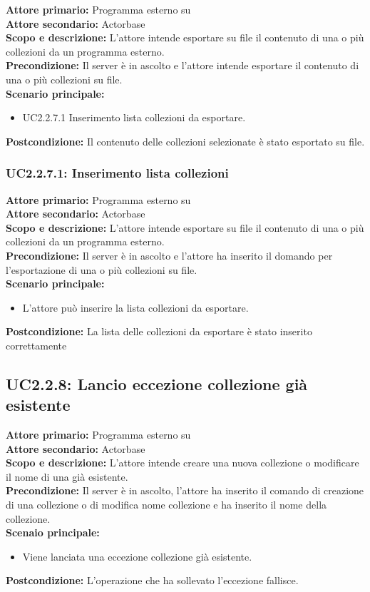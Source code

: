 \documentclass{scalatekids-article}
\begin{document}
\textbf{Attore primario:} Programma esterno su \\
\textbf{Attore secondario:} Actorbase\\
\textbf{Scopo e descrizione:} L'attore intende esportare su file il contenuto di una o più collezioni da un programma  esterno.\\
\textbf{Precondizione:} Il server è in ascolto e l'attore intende esportare il contenuto di una o più collezioni su file.\\
\textbf{Scenario principale:}
\begin{itemize}
\item UC2.2.7.1 Inserimento lista collezioni da esportare.
\end{itemize}
\textbf{Postcondizione:} Il contenuto delle collezioni selezionate è stato esportato su file.

\subsubsection{UC2.2.7.1: Inserimento lista collezioni}

\textbf{Attore primario:} Programma esterno su \\
\textbf{Attore secondario:} Actorbase\\
\textbf{Scopo e descrizione:} L'attore intende esportare su file il contenuto di una o più collezioni da un programma  esterno.\\
\textbf{Precondizione:} Il server è in ascolto e l'attore ha inserito il domando per l'esportazione di una o più collezioni su file.\\
\textbf{Scenario principale:}
\begin{itemize}
\item L'attore può inserire la lista collezioni da esportare.
\end{itemize}
\textbf{Postcondizione:} La lista delle collezioni da esportare è stato inserito correttamente

\subsection{UC2.2.8: Lancio eccezione collezione già esistente}

\textbf{Attore primario:} Programma esterno su \\
\textbf{Attore secondario:} Actorbase\\
\textbf{Scopo e descrizione:} L'attore intende creare una nuova collezione o modificare il nome di una già esistente.\\
\textbf{Precondizione:} Il server è in ascolto, l'attore ha inserito il comando di creazione di una collezione o di modifica nome collezione e ha inserito il nome della collezione.\\
\textbf{Scenaio principale:}
\begin{itemize}
\item Viene lanciata una eccezione collezione già esistente.
\end{itemize}
\textbf{Postcondizione:} L'operazione che ha sollevato l'eccezione fallisce.
\end{document}
